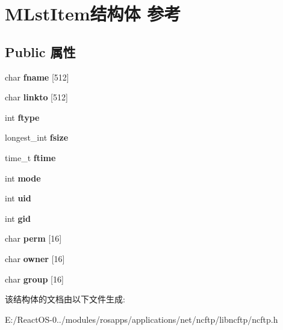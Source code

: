 \hypertarget{struct_m_lst_item}{}\section{M\+Lst\+Item结构体 参考}
\label{struct_m_lst_item}
\subsection*{Public 属性}
\begin{DoxyCompactItemize}
\item 
\mbox{\label{struct_m_lst_item_a648266a015108fc386e6edeb5ccc4641}} 
char {\bfseries fname} \mbox{[}512\mbox{]}
\item 
\mbox{\label{struct_m_lst_item_afc0e2c210c27a949aa12f85d6db16a81}} 
char {\bfseries linkto} \mbox{[}512\mbox{]}
\item 
\mbox{\label{struct_m_lst_item_a73a34d7a997c2ba455ef679255d7c4d0}} 
int {\bfseries ftype}
\item 
\mbox{\label{struct_m_lst_item_a57b4b2f072c3d3ec689873bfb1e68525}} 
longest\+\_\+int {\bfseries fsize}
\item 
\mbox{\label{struct_m_lst_item_a632b90acff23a0759272c06dd66702d5}} 
time\+\_\+t {\bfseries ftime}
\item 
\mbox{\label{struct_m_lst_item_a80e70f3efea87ba95d8d465cb7068787}} 
int {\bfseries mode}
\item 
\mbox{\label{struct_m_lst_item_aa685ddd58451c4a996f2eca70634efc3}} 
int {\bfseries uid}
\item 
\mbox{\label{struct_m_lst_item_a6becce4573b42bd48e8d3f03e5866df1}} 
int {\bfseries gid}
\item 
\mbox{\label{struct_m_lst_item_a679a88165e2fd54d8da187c5ecd70e8d}} 
char {\bfseries perm} \mbox{[}16\mbox{]}
\item 
\mbox{\label{struct_m_lst_item_aac711f7b12e2fda9293a5b8a71defac7}} 
char {\bfseries owner} \mbox{[}16\mbox{]}
\item 
\mbox{\label{struct_m_lst_item_ac1c0519b08749c0c145d08f8456435a9}} 
char {\bfseries group} \mbox{[}16\mbox{]}
\end{DoxyCompactItemize}


该结构体的文档由以下文件生成\+:\begin{DoxyCompactItemize}
\item 
E\+:/\+React\+O\+S-\/0../modules/rosapps/applications/net/ncftp/libncftp/ncftp.\+h\end{DoxyCompactItemize}
